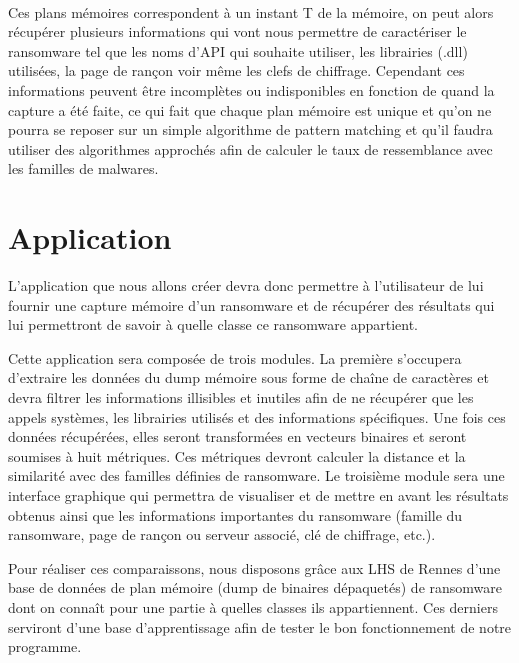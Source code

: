 \documentclass[11pt]{article}
\begin{document}
\paragraph{}
Ces plans mémoires correspondent à un instant T de la mémoire, on peut alors récupérer plusieurs informations qui vont nous permettre de caractériser le ransomware tel que les noms d’API qui souhaite utiliser, les librairies (\gls{.dll}) utilisées, la page de rançon voir même les clefs de chiffrage. Cependant ces informations peuvent être incomplètes ou indisponibles en fonction de quand la capture a été faite, ce qui fait que chaque plan mémoire est unique et qu’on ne pourra se reposer sur un simple algorithme de pattern matching et qu'il faudra utiliser des algorithmes approchés afin de calculer le taux de ressemblance avec les familles de malwares.

\section{Application}
L'application que nous allons créer devra donc permettre à l'utilisateur de lui fournir une capture mémoire d'un ransomware et de récupérer des résultats qui lui permettront de savoir à quelle classe ce ransomware appartient.

Cette application sera composée de trois modules.
La première s’occupera d’extraire les données du dump mémoire sous forme de chaîne de caractères et devra filtrer les informations illisibles et inutiles afin de ne récupérer que les appels systèmes, les librairies utilisés et des informations spécifiques.
Une fois ces données récupérées, elles seront transformées en vecteurs binaires et seront soumises à huit métriques.
Ces métriques devront calculer la distance et la similarité avec des familles définies de ransomware.
Le troisième module sera une interface graphique qui permettra de visualiser et de mettre en avant les résultats obtenus ainsi que les informations importantes du ransomware (famille du ransomware, page de rançon ou serveur associé, clé de chiffrage, etc.).

Pour réaliser ces comparaissons, nous disposons grâce aux \gls{LHS} de Rennes d'une base de données de plan mémoire (dump de binaires dépaquetés) de ransomware dont on connaît pour une partie à quelles classes ils appartiennent. Ces derniers serviront d'une base d'apprentissage afin de tester le bon fonctionnement de notre programme.
\end{document}
